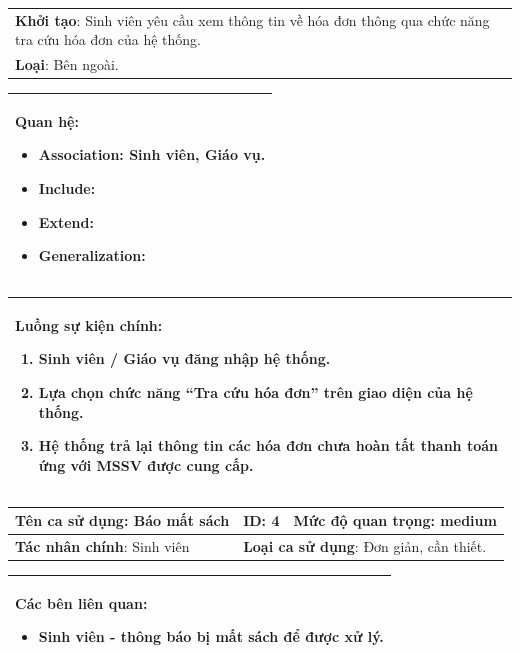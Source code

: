 \documentclass[../report.tex]{subfiles}
\begin{document}
\begin{center}
\begin{tabular}{| m{15.9cm} |}
    \hline
    \textbf{Khởi tạo}: Sinh viên yêu cầu xem thông tin về hóa đơn thông qua chức năng tra cứu hóa đơn của hệ thống. \\
    \textbf{Loại}: Bên ngoài.  \\
    \hline
\end{tabular}

\begin{tabular}{| m{15.9cm} |}
    \hline
    \textbf{Quan hệ}:
    \begin{itemize}
        \item Association: Sinh viên, Giáo vụ. 
        \item Include: 
        \item Extend: 
        \item Generalization: 
    \end{itemize} \\
    \hline
\end{tabular}

\begin{tabular}{| m{15.9cm} |}
    \hline
    \textbf{Luồng sự kiện chính}:
    \begin{enumerate}
        \item Sinh viên / Giáo vụ đăng nhập hệ thống. 
        \item Lựa chọn chức năng ``Tra cứu hóa đơn'' trên giao diện của hệ thống. 
        \item Hệ thống trả lại thông tin các hóa đơn chưa hoàn tất thanh toán ứng với MSSV được cung cấp. 
    \end{enumerate} \\
    \hline
\end{tabular}

\newpage
\begin{tabular}{| m{6cm} | m{3cm} | m{6cm} |}
    \hline
    \textbf{Tên ca sử dụng}: Báo mất sách & \textbf{ID}: 4 & \textbf{Mức độ quan trọng}: medium \\
    \hline
    \textbf{Tác nhân chính}: Sinh viên & \multicolumn{2}{|l|}{\textbf{Loại ca sử dụng}: Đơn giản, cần thiết.} \\
    \hline
\end{tabular}
\begin{tabular}{| m{15.9cm} |}
    \hline
        \textbf{Các bên liên quan:} 
        \begin{itemize}
            \item Sinh viên - thông báo bị mất sách để được xử lý. 
        \end{itemize} \\
    \hline
\end{tabular}


\end{center}
\end{document}
